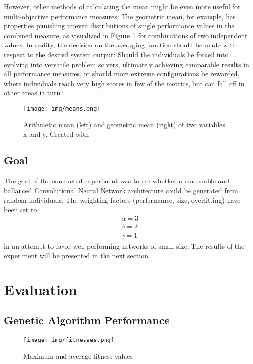 \documentclass[11pt,a4paper,twoside,openright]{scrbook}
\begin{document}
However, other methods of calculating the mean might be even more useful for multi-objective performance measures:
The geometric mean, for example, has properties punishing uneven distributions of single performance values in the combined measure, as visualized in Figure \ref{fig:means} for combinations of two independent values. In reality, the decision on the averaging function should be made with respect to the desired system output: Should the individuals be forced into evolving into versatile problem solvers, ultimately achieving comparable results in all performance measures, or should more extreme configurations be rewarded, where individuals reach very high scores in few of the metrics, but can fall off in other areas in turn?

\begin{figure}[h]
  \centering
  \texttt{[image: img/means.png]}
  \caption{Arithmetic mean (left) and geometric mean (right) of two variables x and y. Created with \cite{url:3Dplotter}}
  \label{fig:means}
\end{figure}

\subsection{Goal}

The goal of the conducted experiment was to see whether a reasonable and ballanced Convolutional Neural Network architecture could be generated from random individuals. The weighting factors (performance, size, overfitting) have been set to
\begin{align*}
  & \alpha = 3 \\ & \beta = 2 \\ & \gamma = 1
\end{align*}
in an attempt to favor well performing networks of small size. The results of the experiment will be presented in the next section.

\section{Evaluation}
\label{chapter:Evaluation}

\subsection{Genetic Algorithm Performance}

\begin{figure}[h]
  \centering
  \texttt{[image: img/fitnesses.png]}
  \caption{Maximum and average fitness values}
  \label{fig:fitnesses}
\end{figure}
\end{document}
